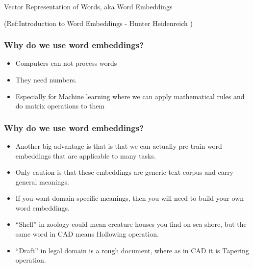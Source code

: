 \begin{frame}[fragile]\frametitle{}

\begin{center}
{\Large Vector Representation of Words, aka Word Embeddings}

{\tiny (Ref:Introduction to Word Embeddings - Hunter Heidenreich )}

\end{center}

\end{frame}

\begin{frame}[fragile]\frametitle{Why do we use word embeddings?}
  \begin{itemize}
    \item Computers can not process words
	\item They need numbers.
	\item Especially for Machine learning where we can apply mathematical rules and do matrix operations to them
  \end{itemize}


\end{frame}

\begin{frame}[fragile]\frametitle{Why do we use word embeddings?}
  \begin{itemize}
    \item Another big advantage is that  is that we can actually pre-train word embeddings that are applicable to many tasks. 
	\item Only caution is that these embeddings are generic text corpus and carry general meanings.
	\item If you want domain specific meanings, then you will need to build your own word embeddings.
	\item ``Shell'' in zoology could mean creature houses you find on sea shore, but the same word in CAD means Hollowing operation.
	\item ``Draft'' in legal domain is a rough document, where as in CAD it is Tapering operation.
  \end{itemize}



\end{frame}


